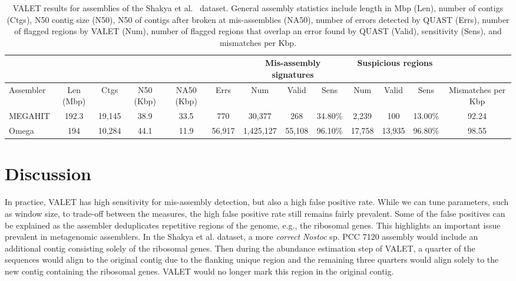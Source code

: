 \documentclass[12pt,\mydriver]{thesis}
\begin{document}
\begin{landscape}
\renewcommand{\baselinestretch}{1}
\small\normalsize
\begin{table}[tb!]
\centering
\footnotesize
\label{synthetic_valet}
\begin{tabular}{|l|c|c|c|c|c|c|c|c|c|c|c|c|}
  \hline
  \multicolumn{6}{|c}{} & \multicolumn{3}{|c|}{Mis-assembly signatures} & \multicolumn{3}{c|}{Suspicious regions}   &  \\
  \hline
  Assembler & Len (Mbp) & Ctgs   & N50 (Kbp) & NA50 (Kbp) & Errs   & Num       & Valid  & Sens    & Num    & Valid  & Sens    & Mismatches per Kbp \\
  \hline
  MEGAHIT   & 192.3     & 19,145 & 38.9      & 33.5       & 770    & 30,377    & 268    & 34.80\% & 2,239  & 100    & 13.00\% & 92.24              \\
  Omega     & 194       & 10,284 & 44.1      & 11.9       & 56,917 & 1,425,127 & 55,108 & 96.10\% & 17,758 & 13,935 & 96.80\% & 98.55 \\
  \hline
\end{tabular}
\caption[VALET results for assemblies of the Shakya et al.~\cite{shakya2013comparative} dataset]{VALET results for assemblies of the Shakya et al.~\cite{shakya2013comparative} dataset. General assembly statistics include length in Mbp (Len), number of contigs (Ctgs), N50 contig size (N50), N50 of contigs after broken at mis-assemblies (NA50), number of errors detected by QUAST (Errs), number of flagged regions by VALET (Num), number of flagged regions that overlap an error found by QUAST (Valid), sensitivity (Sens), and mismatches per Kbp.}
\end{table}
\renewcommand{\baselinestretch}{2}
\small\normalsize
\end{landscape}


\section{Discussion}


In practice, VALET has high sensitivity for mis-assembly detection, but also a high false positive rate.
While we can tune parameters, such as window size, to trade-off between the measures, the high false positive rate still remains fairly prevalent.
Some of the false positives can be explained as the assembler deduplicates repetitive regions of the genome, e.g., the ribosomal genes.
This highlights an important issue prevalent in metagenomic assemblers.
In the Shakya et al. dataset, a more \emph{correct} \emph{Nostoc} sp. PCC 7120 assembly would include an additional contig consisting solely of the ribosomal genes.
Then during the abundance estimation step of VALET, a quarter of the sequences would align to the original contig due to the flanking unique region and the remaining three quarters would align solely to the new contig containing the ribosomal genes.
VALET would no longer mark this region in the original contig.
\end{document}
